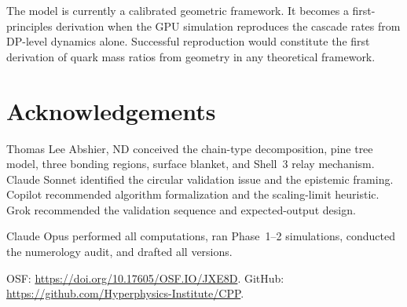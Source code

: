 \documentclass[11pt,letterpaper]{article}
\begin{document}
The model is currently a calibrated geometric framework.  It
becomes a first-principles derivation when the GPU simulation
reproduces the cascade rates from DP-level dynamics alone.
Successful reproduction would constitute the first derivation
of quark mass ratios from geometry in any theoretical framework.

\section*{Acknowledgements}

Thomas Lee Abshier, ND conceived the chain-type decomposition,
pine tree model, three bonding regions, surface blanket, and
Shell~3 relay mechanism.  Claude Sonnet identified the circular
validation issue and the epistemic framing.  Copilot recommended
algorithm formalization and the scaling-limit heuristic.  Grok
recommended the validation sequence and expected-output design.

Claude Opus performed all computations, ran Phase~1--2
simulations, conducted the numerology audit, and drafted all
versions.

OSF: \url{https://doi.org/10.17605/OSF.IO/JXE8D}.
GitHub: \url{https://github.com/Hyperphysics-Institute/CPP}.



\end{document}

